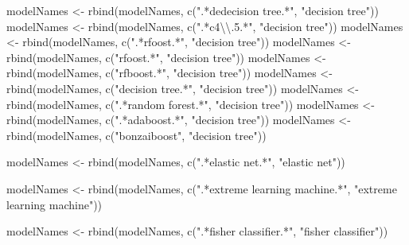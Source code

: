 \documentclass[
]{article}
\newenvironment{Shaded}{\begin{snugshade}}{\end{snugshade}}
\newcommand{\FunctionTok}[1]{\textcolor[rgb]{0.00,0.00,0.00}{#1}}
\newcommand{\NormalTok}[1]{#1}
\newcommand{\OtherTok}[1]{\textcolor[rgb]{0.56,0.35,0.01}{#1}}
\newcommand{\SpecialCharTok}[1]{\textcolor[rgb]{0.00,0.00,0.00}{#1}}
\newcommand{\StringTok}[1]{\textcolor[rgb]{0.31,0.60,0.02}{#1}}
\begin{document}
\begin{Shaded}
\begin{Highlighting}[]
\NormalTok{modelNames }\OtherTok{\textless{}{-}} \FunctionTok{rbind}\NormalTok{(modelNames, }\FunctionTok{c}\NormalTok{(}\StringTok{".*dedecision tree.*"}\NormalTok{, }\StringTok{"decision tree"}\NormalTok{))}
\NormalTok{modelNames }\OtherTok{\textless{}{-}} \FunctionTok{rbind}\NormalTok{(modelNames, }\FunctionTok{c}\NormalTok{(}\StringTok{".*c4}\SpecialCharTok{\textbackslash{}\textbackslash{}}\StringTok{.5.*"}\NormalTok{, }\StringTok{"decision tree"}\NormalTok{))}
\NormalTok{modelNames }\OtherTok{\textless{}{-}} \FunctionTok{rbind}\NormalTok{(modelNames, }\FunctionTok{c}\NormalTok{(}\StringTok{".*rfoost.*"}\NormalTok{, }\StringTok{"decision tree"}\NormalTok{))}
\NormalTok{modelNames }\OtherTok{\textless{}{-}} \FunctionTok{rbind}\NormalTok{(modelNames, }\FunctionTok{c}\NormalTok{(}\StringTok{"rfoost.*"}\NormalTok{, }\StringTok{"decision tree"}\NormalTok{))}
\NormalTok{modelNames }\OtherTok{\textless{}{-}} \FunctionTok{rbind}\NormalTok{(modelNames, }\FunctionTok{c}\NormalTok{(}\StringTok{"rfboost.*"}\NormalTok{, }\StringTok{"decision tree"}\NormalTok{))}
\NormalTok{modelNames }\OtherTok{\textless{}{-}} \FunctionTok{rbind}\NormalTok{(modelNames, }\FunctionTok{c}\NormalTok{(}\StringTok{"decision tree.*"}\NormalTok{, }\StringTok{"decision tree"}\NormalTok{))}
\NormalTok{modelNames }\OtherTok{\textless{}{-}} \FunctionTok{rbind}\NormalTok{(modelNames, }\FunctionTok{c}\NormalTok{(}\StringTok{".*random forest.*"}\NormalTok{, }\StringTok{"decision tree"}\NormalTok{))}
\NormalTok{modelNames }\OtherTok{\textless{}{-}} \FunctionTok{rbind}\NormalTok{(modelNames, }\FunctionTok{c}\NormalTok{(}\StringTok{".*adaboost.*"}\NormalTok{, }\StringTok{"decision tree"}\NormalTok{))}
\NormalTok{modelNames }\OtherTok{\textless{}{-}} \FunctionTok{rbind}\NormalTok{(modelNames, }\FunctionTok{c}\NormalTok{(}\StringTok{"bonzaiboost"}\NormalTok{, }\StringTok{"decision tree"}\NormalTok{))}

\NormalTok{modelNames }\OtherTok{\textless{}{-}} \FunctionTok{rbind}\NormalTok{(modelNames, }\FunctionTok{c}\NormalTok{(}\StringTok{".*elastic net.*"}\NormalTok{, }\StringTok{"elastic net"}\NormalTok{))}

\NormalTok{modelNames }\OtherTok{\textless{}{-}} \FunctionTok{rbind}\NormalTok{(modelNames, }\FunctionTok{c}\NormalTok{(}\StringTok{".*extreme learning machine.*"}\NormalTok{, }\StringTok{"extreme learning machine"}\NormalTok{))}

\NormalTok{modelNames }\OtherTok{\textless{}{-}} \FunctionTok{rbind}\NormalTok{(modelNames, }\FunctionTok{c}\NormalTok{(}\StringTok{".*fisher classifier.*"}\NormalTok{, }\StringTok{"fisher classifier"}\NormalTok{))}


\end{Highlighting}
\end{Shaded}
\end{document}
